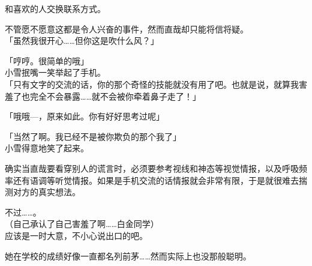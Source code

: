 和喜欢的人交换联系方式。

不管愿不愿意这都是令人兴奋的事件，然而直哉却只能将信将疑。\\

「虽然我很开心……但你这是吹什么风？」

「哼哼。很简单的哦」\\

小雪抿嘴一笑举起了手机。\\

「只有文字的交流的话，你的那个奇怪的技能就没有用了吧。也就是说，就算我害羞了也完全不会暴露……就不会被你牵着鼻子走了！」

「哦哦—，原来如此。你有好好思考过呢」

「当然了啊。我已经不是被你欺负的那个我了」\\

小雪得意地笑了起来。

确实当直哉要看穿别人的谎言时，必须要参考视线和神态等视觉情报，以及呼吸频率还有语调等听觉情报。如果是手机交流的话情报就会非常有限，于是就很难去揣测对方的真实想法。

不过……。\\

（自己承认了自己害羞了啊……白金同学）\\

应该是一时大意，不小心说出口的吧。

她在学校的成绩好像一直都名列前茅……然而实际上也没那般聪明。\\

